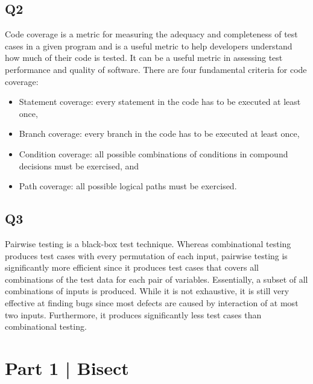 \documentclass[12pt, letterpaper, titlepage]{article}
\begin{document}
\subsection*{Q2}
Code coverage is a metric for measuring the adequacy and completeness of test cases in a given program and is a useful metric to help developers understand how much of their code is tested. It can be a useful metric in assessing test performance and quality of software. There are four fundamental criteria for code coverage: 
\begin{itemize}
    \item Statement coverage: every statement in the code has to be executed at least once,
    \item Branch coverage: every branch in the code has to be executed at least once,
    \item Condition coverage: all possible combinations of conditions in compound decisions must be exercised, and
    \item Path coverage: all possible logical paths must be exercised.
\end{itemize}

\subsection*{Q3}
Pairwise testing is a black-box test technique. Whereas combinational testing produces test cases with every permutation of each input, pairwise testing is significantly more efficient since it produces test cases that covers all combinations of the test data for each pair of variables. Essentially, a subset of all combinations of inputs is produced. While it is not exhaustive, it is still very effective at finding bugs since most defects are caused by interaction of at most two inputs. Furthermore, it produces significantly less test cases than combinational testing.

\section*{Part 1 | Bisect}
\end{document}
